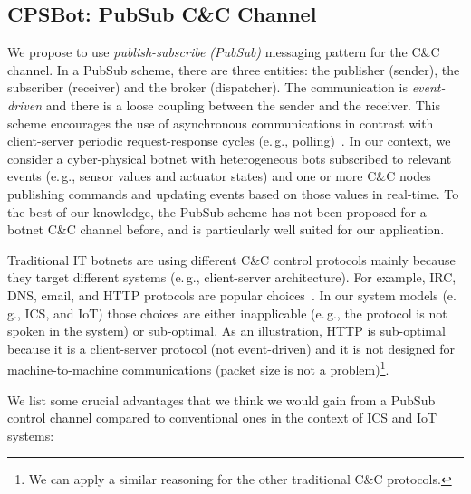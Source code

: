 \documentclass[sigconf]{acmart}
\makeatletter
\newcommand{\eg}{e.\@\,g.,\@\xspace}
\newcommand{\Botnet}{CPSBot\@\xspace}
\newcommand{\CC}{C\&C\@\xspace}
\makeatother
\begin{document}

\subsection{\Botnet: PubSub \CC Channel}

We propose to use \emph{publish-subscribe (PubSub)} messaging pattern
for the \CC channel. In a PubSub scheme, there are three
entities: the publisher (sender), the subscriber (receiver) and the
broker (dispatcher). The communication is \emph{event-driven} and
there is a loose coupling between the sender and the receiver. This
scheme encourages the use of asynchronous communications in contrast
with client-server periodic request-response cycles
(\eg polling)~\cite{birman1987exploiting,eugster2003many}.
In our context, we consider a cyber-physical botnet with heterogeneous
bots subscribed to relevant events (\eg sensor values and actuator
states) and one or more \CC nodes publishing commands and updating
events based on those values in real-time. To the best of our
knowledge, the PubSub scheme has not been proposed for a botnet \CC
channel before, and is particularly well suited for our application.

Traditional IT botnets are using different \CC control protocols
mainly because they target different systems (\eg client-server
architecture). For example, IRC, DNS, email, and HTTP protocols are popular
choices~\cite{vormayr2017botnet}. In our system models (\eg ICS, and IoT)
those choices are either inapplicable (\eg the protocol is not spoken in the
system) or sub-optimal. As an illustration, HTTP is sub-optimal because it is a
client-server protocol (not event-driven) and it is not designed for
machine-to-machine communications (packet size is not a problem)\footnote{
We can apply a similar reasoning for the other traditional \CC protocols.}.

We list some crucial advantages that we think we would gain from
a PubSub control channel compared to conventional ones in the context of ICS
and IoT systems:
\end{document}

